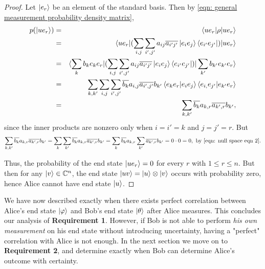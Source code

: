 \begin{proof}




Let $\ket{e_r}$ be an element of the standard basis.  Then by \eqref{eqn: general measurement probability density matrix},
\begin{eqnarray*}
p(\ket{ue_r})&=&\braket{ue_r | \rho |ue_r}\\
&=&\braket{ue_r| (\sum_{i,j} \sum_{i',j'} a_{ij} \overline{a_{i'j'}}\ket{e_i e_j}\bra{e_{i'} e_{j'}})|ue_r} \\
&=&\braket{\sum_k b_ke_k e_r| (\sum_{i,j} \sum_{i',j'} a_{ij} \overline{a_{i'j'}}\ket{e_i e_j}\bra{e_{i'} e_{j'}})|\sum_{k'}b_{k'}e_{k'}e_r}\\
&=&\sum_{k,k'}\sum_{i,j}\sum_{i',j'}\overline{b_k}a_{i,j}\overline{a_{i',j'}}b_{k'}\braket{e_k e_r|e_i e_j}\braket{e_{i,}e_{j'}|e_{k'}e_r}\\
&=&\sum_{k,k'}\overline{b_k}a_{k,r}\overline{a_{k',r}}b_{k'},
\end{eqnarray*}
since the inner products are nonzero only when $i=i'=k$ and $j=j'=r$.  But
\begin{equation*}
\sum_{k,k'}\overline{b_k}a_{k,r}\overline{a_{k',r}}b_{k'}=\sum_k \sum_{k'} \overline{b_k}a_{k,r}\overline{a_{k',r}}b_{k'}
=\sum_k \overline{b_k}a_{k,r} \sum_{k'}\overline{a_{k',r}}b_{k'}
=0\cdot 0=0, \textrm{ by }\eqref{eqn: null space eqn 2}.
\end{equation*}

Thus, the probability of the end state $\ket{u e_r}=0$ for every $r$ with $1\leq r \leq n$.  But then for any $\ket{v} \in {\mathbb{C}}^n$, the end state $\ket{uv} = \ket{u}\otimes\ket{v}$ occurs with probability zero, hence Alice cannot have end state $\ket{u}$.
\end{proof}

We have now described exactly when there exists perfect correlation between Alice's end state $\ket{\varphi}$ and Bob's end state $\ket{\theta}$ after Alice measures.  This concludes our analysis of {\bf{Requirement 1}}.  However, if Bob is not able to perform {\emph{his own measurement}} on his end state without introducing uncertainty, having a "perfect" correlation with Alice is not enough. In the next section we move on to {\bf{Requirement 2}}, and determine exactly when Bob can determine Alice's outcome with certainty.


